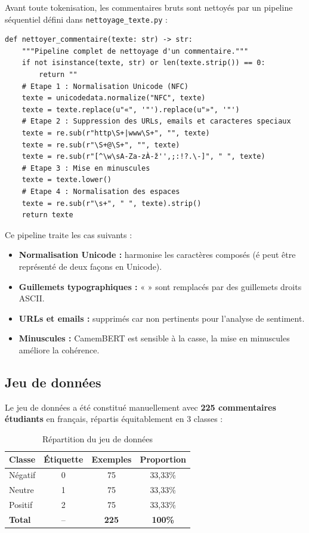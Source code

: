 Avant toute tokenisation, les commentaires bruts sont nettoyés par un
pipeline séquentiel défini dans \texttt{nettoyage\_texte.py} :

\begin{lstlisting}[style=stylePython, caption={Pipeline de nettoyage NLP}, label={lst:nettoyage}]
def nettoyer_commentaire(texte: str) -> str:
    """Pipeline complet de nettoyage d'un commentaire."""
    if not isinstance(texte, str) or len(texte.strip()) == 0:
        return ""
    # Etape 1 : Normalisation Unicode (NFC)
    texte = unicodedata.normalize("NFC", texte)
    texte = texte.replace(u"«", '"').replace(u"»", '"')
    # Etape 2 : Suppression des URLs, emails et caracteres speciaux
    texte = re.sub(r"http\S+|www\S+", "", texte)
    texte = re.sub(r"\S+@\S+", "", texte)
    texte = re.sub(r"[^\w\sA-Za-zÀ-ž'',;:!?.\-]", " ", texte)
    # Etape 3 : Mise en minuscules
    texte = texte.lower()
    # Etape 4 : Normalisation des espaces
    texte = re.sub(r"\s+", " ", texte).strip()
    return texte
\end{lstlisting}

Ce pipeline traite les cas suivants :
\begin{itemize}
  \item \textbf{Normalisation Unicode :} harmonise les caractères composés
        (é peut être représenté de deux façons en Unicode).
  \item \textbf{Guillemets typographiques :} « » sont remplacés par des
        guillemets droits ASCII.
  \item \textbf{URLs et emails :} supprimés car non pertinents pour l'analyse
        de sentiment.
  \item \textbf{Minuscules :} CamemBERT est sensible à la casse, la mise
        en minuscules améliore la cohérence.
\end{itemize}

\subsection{Jeu de données}

Le jeu de données a été constitué manuellement avec \textbf{225 commentaires
étudiants} en français, répartis équitablement en 3 classes :

\begin{table}[H]
\centering
\caption{Répartition du jeu de données}
\label{tab:dataset}
\renewcommand{\arraystretch}{1.4}
\begin{tabular}{lccc}
\toprule
\rowcolor{bleuprincipal!15}
\textbf{Classe} & \textbf{Étiquette} & \textbf{Exemples} & \textbf{Proportion} \\
\midrule
Négatif & 0 & 75 & 33,33\% \\
\rowcolor{gray!8}
Neutre & 1 & 75 & 33,33\% \\
Positif & 2 & 75 & 33,33\% \\
\midrule
\rowcolor{bleuprincipal!8}
\textbf{Total} & -- & \textbf{225} & \textbf{100\%} \\
\bottomrule
\end{tabular}
\end{table}

